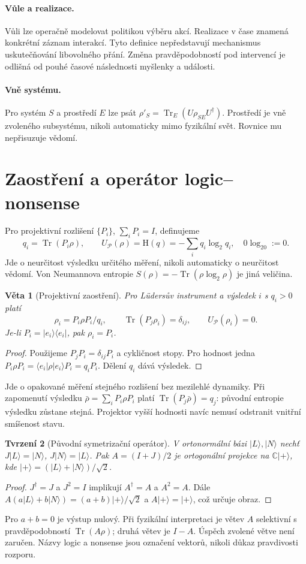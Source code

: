 \documentclass[11pt,a4paper]{article}
\newtheorem{theorem}{Věta}
\newtheorem{proposition}[theorem]{Tvrzení}
\DeclareMathOperator{\Tr}{Tr}
\newcommand{\HH}{\mathrm H}
\begin{document}
\paragraph{Vůle a realizace.}
Vůli lze operačně modelovat politikou výběru akcí. Realizace v čase znamená konkrétní záznam interakcí. Tyto definice nepředstavují mechanismus uskutečňování libovolného přání. Změna pravděpodobností pod intervencí je odlišná od pouhé časové následnosti myšlenky a události.

\paragraph{Vně systému.}
Pro systém $S$ a prostředí $E$ lze psát
$\rho'_S=\Tr_E(U\rho_{SE}U^\dagger)$.
Prostředí je vně zvoleného subsystému, nikoli automaticky mimo fyzikální svět. Rovnice mu nepřisuzuje vědomí.

\newpage
\section{Zaostření a operátor logic--nonsense}
Pro projektivní rozlišení $\{P_i\}$, $\sum_iP_i=I$, definujeme
\[
q_i=\Tr(P_i\rho),\qquad U_{\mathcal P}(\rho)=\HH(q)
=-\sum_iq_i\log_2q_i,\quad 0\log_20:=0.
\]
Jde o neurčitost výsledku určitého měření, nikoli automaticky o neurčitost vědomí. Von Neumannova entropie $S(\rho)=-\Tr(\rho\log_2\rho)$ je jiná veličina.

\begin{theorem}[Projektivní zaostření]
Pro Lüdersův instrument a výsledek $i$ s $q_i>0$ platí
\[
\rho_i=P_i\rho P_i/q_i,\qquad \Tr(P_j\rho_i)=\delta_{ij},
\qquad U_{\mathcal P}(\rho_i)=0.
\]
Je-li $P_i=|e_i\rangle\langle e_i|$, pak $\rho_i=P_i$.
\end{theorem}
\begin{proof}
Použijeme $P_jP_i=\delta_{ij}P_i$ a cykličnost stopy.
Pro hodnost jedna
$P_i\rho P_i=\langle e_i|\rho|e_i\rangle P_i=q_iP_i$.
Dělení $q_i$ dává výsledek.
\end{proof}
Jde o opakované měření stejného rozlišení bez mezilehlé dynamiky. Při zapomenutí výsledku $\bar\rho=\sum_iP_i\rho P_i$ platí
$\Tr(P_j\bar\rho)=q_j$: původní entropie výsledku zůstane stejná.
Projektor vyšší hodnosti navíc nemusí odstranit vnitřní smíšenost stavu.

\begin{proposition}[Původní symetrizační operátor]
V ortonormální bázi $|L\rangle,|N\rangle$ nechť
$J|L\rangle=|N\rangle$, $J|N\rangle=|L\rangle$.
Pak $A=(I+J)/2$ je ortogonální projekce na
$\mathbb C|+\rangle$, kde $|+\rangle=(|L\rangle+|N\rangle)/\sqrt2$.
\end{proposition}
\begin{proof}
$J^\dagger=J$ a $J^2=I$ implikují $A^\dagger=A$ a $A^2=A$.
Dále
$A(a|L\rangle+b|N\rangle)=(a+b)|+\rangle/\sqrt2$
a $A|+\rangle=|+\rangle$, což určuje obraz.
\end{proof}
Pro $a+b=0$ je výstup nulový. Při fyzikální interpretaci je větev $A$ selektivní s pravděpodobností $\Tr(A\rho)$; druhá větev je $I-A$. Úspěch zvolené větve není zaručen.
Názvy logic a nonsense jsou označení vektorů, nikoli důkaz pravdivosti rozporu.
\end{document}
